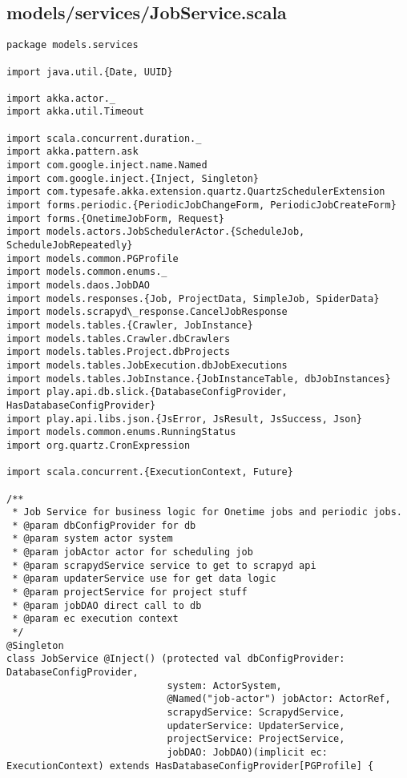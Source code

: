 \subsection{models/services/JobService.scala}
\begin{lstlisting}
package models.services

import java.util.{Date, UUID}

import akka.actor._
import akka.util.Timeout

import scala.concurrent.duration._
import akka.pattern.ask
import com.google.inject.name.Named
import com.google.inject.{Inject, Singleton}
import com.typesafe.akka.extension.quartz.QuartzSchedulerExtension
import forms.periodic.{PeriodicJobChangeForm, PeriodicJobCreateForm}
import forms.{OnetimeJobForm, Request}
import models.actors.JobSchedulerActor.{ScheduleJob, ScheduleJobRepeatedly}
import models.common.PGProfile
import models.common.enums._
import models.daos.JobDAO
import models.responses.{Job, ProjectData, SimpleJob, SpiderData}
import models.scrapyd\_response.CancelJobResponse
import models.tables.{Crawler, JobInstance}
import models.tables.Crawler.dbCrawlers
import models.tables.Project.dbProjects
import models.tables.JobExecution.dbJobExecutions
import models.tables.JobInstance.{JobInstanceTable, dbJobInstances}
import play.api.db.slick.{DatabaseConfigProvider, HasDatabaseConfigProvider}
import play.api.libs.json.{JsError, JsResult, JsSuccess, Json}
import models.common.enums.RunningStatus
import org.quartz.CronExpression

import scala.concurrent.{ExecutionContext, Future}

/**
 * Job Service for business logic for Onetime jobs and periodic jobs.
 * @param dbConfigProvider for db
 * @param system actor system
 * @param jobActor actor for scheduling job
 * @param scrapydService service to get to scrapyd api
 * @param updaterService use for get data logic
 * @param projectService for project stuff
 * @param jobDAO direct call to db
 * @param ec execution context
 */
@Singleton
class JobService @Inject() (protected val dbConfigProvider: DatabaseConfigProvider,
                            system: ActorSystem,
                            @Named("job-actor") jobActor: ActorRef,
                            scrapydService: ScrapydService,
                            updaterService: UpdaterService,
                            projectService: ProjectService,
                            jobDAO: JobDAO)(implicit ec: ExecutionContext) extends HasDatabaseConfigProvider[PGProfile] {


\end{lstlisting}

